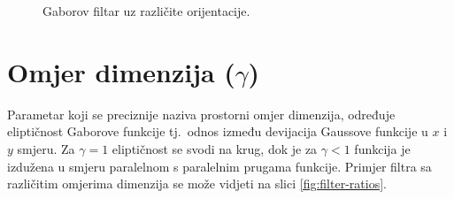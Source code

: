 \documentclass{ru}
\begin{document}
\begin{figure}[h!tb]
\centering
{}
\hspace{50pt}
\caption{Gaborov filtar uz različite orijentacije.}
\label{fig:filter-orientations}
\end{figure}


\section{Omjer dimenzija ($\gamma $)}
Parametar koji se preciznije naziva prostorni omjer dimenzija, određuje
eliptičnost Gaborove funkcije tj.~odnos između devijacija Gaussove funkcije u
$x$ i $y$ smjeru. Za $\gamma = 1$ eliptičnost se svodi na krug, dok je za
$\gamma < 1$ funkcija je izdužena u smjeru paralelnom s paralelnim prugama
funkcije. Primjer filtra sa različitim omjerima dimenzija se može vidjeti na
slici \ref{fig:filter-ratios}.
\end{document}
